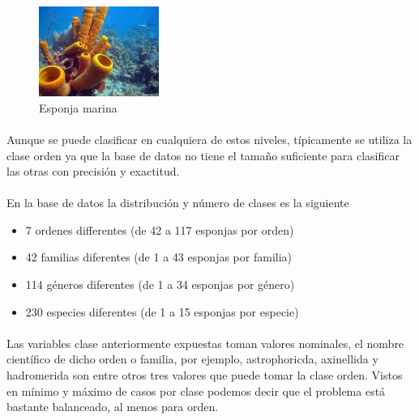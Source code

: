 \documentclass[es]{ifirak}
\begin{document}
\begin{figure}
	\begin{center}
		\includegraphics[width=0.35\textwidth]{telechargement.png}
	\end{center}
	\caption{Esponja marina}
	\vspace{-50pt}
\end{figure}

\paragraph{}
Aunque se puede clasificar en cualquiera de estos niveles, típicamente se utiliza la clase orden ya que la base de datos no tiene el tamaño suficiente para clasificar las otras con precisión y exactitud.
\paragraph{}
En la base de datos la distribución y número de clases es la siguiente
\begin{itemize}
\item 7 ordenes differentes (de 42 a 117 esponjas por orden)
\item 42 familias diferentes (de 1 a 43 esponjas por familia)
\item 114 géneros diferentes (de 1 a 34 esponjas por género)
\item 230 especies diferentes (de 1 a 15 esponjas por especie)
\end{itemize}

\paragraph{}
Las variables clase anteriormente expuestas toman valores nominales, el nombre científico de dicho orden o  familia, por ejemplo, astrophoricda, axinellida y hadromerida son entre otros tres valores que puede tomar la clase orden. 
Vistos en mínimo y máximo de casos por clase podemos decir que el problema está bastante balanceado, al menos para orden.
\end{document}
